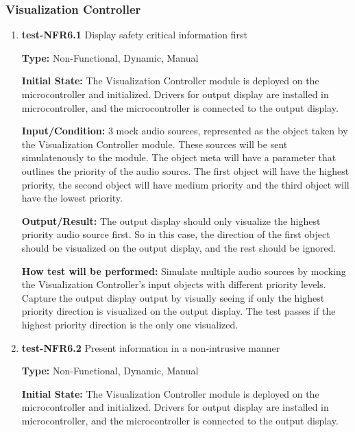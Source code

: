 \documentclass[12pt, titlepage]{article}
\begin{document}
\subsubsection{Visualization Controller}
		

\begin{enumerate}

\item{\textbf{test-NFR6.1} Display safety critical information first\\}

\textbf{Type:} Non-Functional, Dynamic, Manual
					
\textbf{Initial State:} 
The Visualization Controller module is deployed on the microcontroller and 
initialized. Drivers for output display are installed in microcontroller, 
and the microcontroller is connected to the output display. 
					
\textbf{Input/Condition:} 
3 mock audio sources, represented as the object taken by the Visualization 
Controller module. These sources will be sent simulatenously to the module. The 
object meta will have a parameter that outlines the priority of the audio 
sourcs. The first object will have the highest priority, the second object will 
have medium priority and the third object will have the lowest priority.

\textbf{Output/Result:} 
The output display should only visualize the highest priority audio source 
first. So in this case, the direction of the first object should be visualized 
on the output display, and the rest should be ignored. 
					
\textbf{How test will be performed:} 
Simulate multiple audio sources by mocking the Visualization Controller's input 
objects with different priority levels. Capture the output display output by 
visually seeing if only the highest priority direction is visualized on the 
output display. The test passes if the highest priority direction is the only
 one visualized.

					
\item{\textbf{test-NFR6.2} Present information in a non-intrusive manner\\}

\textbf{Type:} Non-Functional, Dynamic, Manual
					
\textbf{Initial State:} 
The Visualization Controller module is deployed on the microcontroller and 
initialized. Drivers for output display are installed in microcontroller, 
and the microcontroller is connected to the output display. 
					

\end{enumerate}
\end{document}
